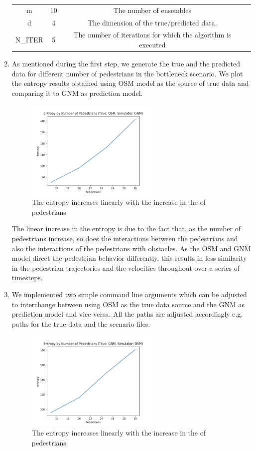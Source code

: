 \documentclass[10pt,a4paper]{article}
\begin{document}
\begin{enumerate}
\begin{center}
\begin{tabular}{ |c|c|c|c| }
	m & 10 & The number of ensembles \\ 
	d & 4 & The dimension of the true/predicted data. \\ 
	N\_ITER & 5 & The number of iterations for which the algorithm is executed \\ 
	\hline
\end{tabular}
\end{center}
	\item As mentioned during the first step, we generate the true and the predicted data for different number of pedestrians in the bottleneck scenario. We plot the entropy results obtained using OSM model as the source of true data and comparing it to GNM as prediction model.
	\begin{figure}[H]
    \centering
    \includegraphics[width=0.6\textwidth]{pictures/task5/osm_gnm.png}
    \caption{The entropy increases linearly with the increase in the of pedestrians}
    \label{fig:osm_gnm}
	\end{figure}
The linear increase in the entropy is due to the fact that, as the number of pedestrians increase, so does the interactions between the pedestrians and also the interactions of the pedestrians with obstacles. As the OSM and GNM model direct the pedestrian behavior differently, this results in less similarity in the pedestrian trajectories and the velocities throughout over a series of timesteps.
	\item We implemented two simple command line arguments which can be adjusted to interchange between using OSM as the true data source and the GNM as prediction model and vice versa. All the paths are adjusted accordingly e.g. paths for the true data and the scenario files.
	\begin{figure}[H]
    \centering
    \includegraphics[width=0.6\textwidth]{pictures/task5/gnm_osm.png}
    \caption{The entropy increases linearly with the increase in the of 			pedestrians}
    \label{fig:gnm_osm}
	\end{figure}
\end{enumerate}
\end{document}
